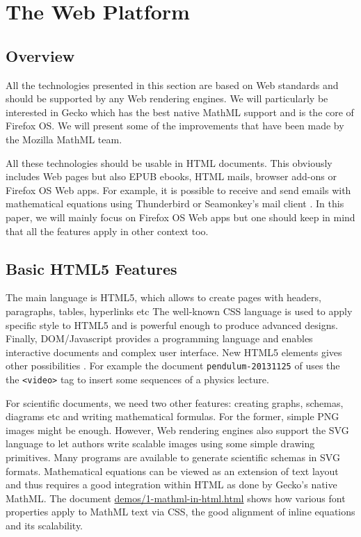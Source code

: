\section{The Web Platform}

\subsection{Overview}

All the technologies presented in this section are based on Web standards and
should be supported by any Web rendering engines. We will particularly be
interested in Gecko which has the best native MathML support and is the core
of Firefox OS. We will present some of the improvements that have been made
by the Mozilla MathML team.

All these technologies should be usable in HTML documents. This obviously
includes Web pages but also EPUB ebooks, HTML mails, browser add-ons or
Firefox OS Web apps. For example, it is possible to receive and send emails
with mathematical equations using Thunderbird or Seamonkey's mail client
\cite{MathInEmails}.
In this paper, we will mainly
focus on Firefox OS Web apps but one should keep in mind that all the features
apply in other context too.

\subsection{Basic HTML5 Features}
\label{sec:basic}

The main language is HTML5, which allows to create pages with headers,
paragraphs, tables, hyperlinks etc The well-known CSS language is used to
apply specific style to HTML5 and is powerful enough to produce advanced
designs. Finally, DOM/Javascript provides a programming language and enables
interactive documents and complex user interface. New HTML5 elements
gives other possibilities . For example the document
{\tt pendulum-20131125} of \cite{MathInEbooks} uses the
the {\tt <video>} tag to insert some sequences of a physics lecture.

For scientific documents, we need two other features: creating graphs, schemas,
diagrams etc and writing mathematical formulas. For the former, simple PNG
images might be enough. However, Web rendering engines also support the SVG
language to let authors write scalable images using some simple drawing
primitives. Many programs are available to generate scientific schemas in SVG
formats. Mathematical equations can be viewed as an extension of text layout
and thus requires a good integration within HTML as done by
Gecko's native MathML. The document \href{http://fred-wang.github.io/MathUI2014/demos/1-mathml-in-html.html}{demos/1-mathml-in-html.html} shows how
various font properties apply to MathML text via CSS, the good alignment
of inline equations and its scalability.

